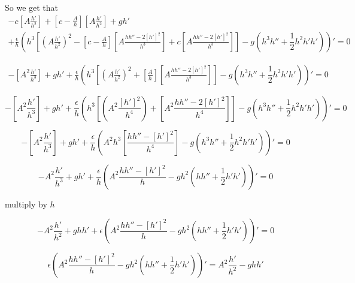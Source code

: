 \documentclass[subeqn]{article}
\begin{document}
So we get that
\begin{multline*}
-c\left[A \frac{h'}{h^2}\right] + \left[ c - \frac{A}{h}\right] \left[A \frac{h'}{h^2}\right]  + gh' \\ + \frac{\epsilon}{h} \left({h^3}\left[\left(A \frac{h'}{h^2} \right)^2 - \left[ c - \frac{A}{h}\right]\left[A \frac{h h'' - 2\left[h'\right]^2}{h^3}\right] + c \left[A \frac{h h'' - 2\left[h'\right]^2}{h^3}\right] \right]  - g \left ( h^3 h''  + \dfrac{1}{2}  h^2h'h' \right )\right)' = 0 \end{multline*}

\begin{multline*}
-\left[A^2 \frac{h'}{h^3}\right]  + gh'  + \frac{\epsilon}{h} \left({h^3}\left[\left(A \frac{h'}{h^2} \right)^2 + \left[ \frac{A}{h}\right]\left[A \frac{h h'' - 2\left[h'\right]^2}{h^3}\right] \right]  - g \left ( h^3 h''  + \dfrac{1}{2}  h^2h'h' \right )\right)' = 0 \end{multline*}

\begin{equation*}
-\left[A^2 \frac{h'}{h^3}\right]  + gh'  + \frac{\epsilon}{h} \left({h^3}\left[\left(A^2 \frac{\left[h'\right]^2}{h^4} \right) + \left[A^2 \frac{h h'' - 2\left[h'\right]^2}{h^4}\right] \right]  - g \left ( h^3 h''  + \dfrac{1}{2}  h^2h'h' \right )\right)' = 0 
\end{equation*}

\begin{equation*}
-\left[A^2 \frac{h'}{h^3}\right]  + gh'  + \frac{\epsilon}{h} \left( A^2{h^3}\left[\frac{h h'' - \left[h'\right]^2}{h^4} \right]  - g \left ( h^3 h''  + \dfrac{1}{2}  h^2h'h' \right )\right)' = 0 
\end{equation*}

\begin{equation*}
-A^2 \frac{h'}{h^3}  + gh'  + \frac{\epsilon}{h} \left( A^2\frac{h h'' - \left[h'\right]^2}{h}  - gh^2 \left ( h h''  + \dfrac{1}{2}  h'h' \right ) \right)' = 0 
\end{equation*}

multiply by $h$

\begin{equation*}
-A^2 \frac{h'}{h^2}  + ghh'  + \epsilon \left( A^2\frac{h h'' - \left[h'\right]^2}{h}  - gh^2 \left ( h h''  + \dfrac{1}{2}  h'h' \right ) \right)' = 0 
\end{equation*}

\begin{equation*}
 \epsilon \left( A^2\frac{h h'' - \left[h'\right]^2}{h}  - gh^2 \left ( h h''  + \dfrac{1}{2}  h'h' \right ) \right)' = A^2 \frac{h'}{h^2} - ghh'
\end{equation*}
\end{document}

